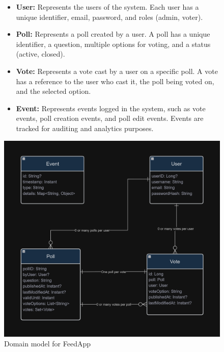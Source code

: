 \begin{figure}[H]
    \begin{minipage}{0.45\textwidth}
        \raggedright
        \begin{itemize}
            \item \textbf{User:} Represents the users of the system. Each user has a unique identifier, email, password, and roles (admin, voter).
            \item \textbf{Poll:} Represents a poll created by a user. A poll has a unique identifier, a question, multiple options for voting, and a status (active, closed).
            \item \textbf{Vote:} Represents a vote cast by a user on a specific poll. A vote has a reference to the user who cast it, the poll being voted on, and the selected option.
            \item \textbf{Event:} Represents events logged in the system, such as vote events, poll creation events, and poll edit events. Events are tracked for auditing and analytics purposes.
        \end{itemize}
    \end{minipage}%
    \hfill
    \begin{minipage}{0.45\textwidth}
        \centering
        \includegraphics[width=\textwidth]{./figs/domain-model.png}
        \caption{Domain model for FeedApp}
        \label{fig:domain_model}
    \end{minipage}
\end{figure}


